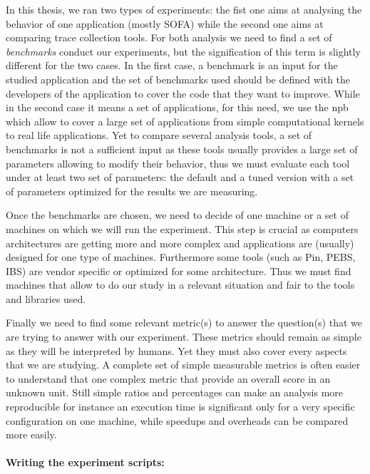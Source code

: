 In this thesis, we ran two types of experiments: the fist one aims at
analysing the behavior of one application (mostly \gls{SOFA}) while the second
one aims at comparing trace collection tools. For both analysis we need to
find a set of \emph{benchmarks} conduct our experiments, but the signification
of this term is slightly different for the two cases. In the first case, a
benchmark is an input for the studied application and the set of benchmarks
used should be defined with the developers of the application to cover the
code that they want to improve. While in the second case it means a set of
applications, for this need, we use the \gls{npb}~\cite{Jin1999} which allow
to cover a large set of applications from simple computational kernels to real
life applications. Yet to compare several analysis tools, a set of benchmarks
is not a sufficient input as these tools usually provides a large set of
parameters allowing to modify their behavior, thus we must evaluate each tool
under at least two set of parameters: the default and a tuned version with a
set of parameters optimized for the results we are measuring.

Once the benchmarks are chosen, we need to decide of one machine or a set of
machines on which we will run the experiment. This step is crucial as
computers architectures are getting more and more complex  and applications are (usually) designed for one type of machines.
Furthermore some tools (such as \gls{Pin}, \gls{PEBS}, \gls{IBS}) are vendor
specific or optimized for some architecture. Thus we must find machines that
allow to do our study in a relevant situation and fair to the tools and
libraries used.

Finally we need to find some relevant metric(s) to answer the question(s) that we
are trying to answer with our experiment. These metrics should remain as
simple as they will be interpreted by humans. Yet they must also cover every
aspects that we are studying. A complete set of simple measurable metrics is
often easier to understand that one complex metric that provide an overall
score in an unknown unit. Still simple ratios and percentages can make an
analysis more reproducible for instance an execution time is significant only
for a very specific configuration on one machine, while speedups and overheads
can be compared more easily.


\paragraph{Writing the experiment scripts:}

